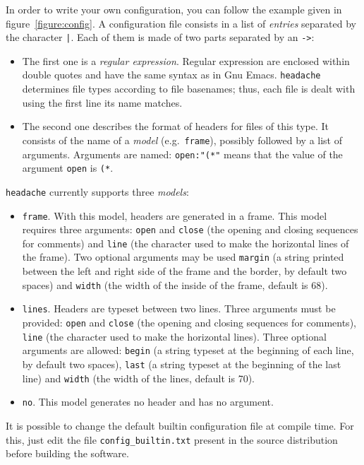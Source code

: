 \documentclass{article}
\newcommand{\mytt}[1]{\texttt{#1}}
\newcommand{\headache}{\mytt{headache}}
\begin{document}
In order to write your own configuration, you can follow the example
given in figure~\ref{figure:config}.  A configuration file consists in
a list of \emph{entries} separated by the character \mytt{|}.  Each
of them is made of two parts separated by an \mytt{->}:
\begin{itemize}
\item The first one is a \emph{regular expression}.  Regular
  expression are enclosed within double quotes and have the same
  syntax as in Gnu Emacs.  \headache{} determines file types according to
  file basenames; thus, each file is dealt with using the first line
  its name matches.
\item The second one describes the format of headers for files of this
  type.  It consists of the name of a \emph{model} (e.g.\ 
  \mytt{frame}), possibly followed by a list of arguments.  Arguments
  are named: \mytt{open:"(*"} means that the value of the argument
  \mytt{open} is \mytt{(*}.
\end{itemize}
\headache{} currently supports three \emph{models}:
\begin{itemize}
\item \mytt{frame}.  With this model, headers are generated in a
  frame.  This model requires three arguments: \mytt{open} and
  \mytt{close} (the opening and closing sequences for comments) and
  \mytt{line} (the character used to make the horizontal lines of the
  frame).  Two optional arguments may be used \mytt{margin} (a string
  printed between the left and right side of the frame and the border,
  by default two spaces) and \mytt{width} (the width of the inside of
  the frame, default is 68).
\item \mytt{lines}.  Headers are typeset between two lines.  Three
  arguments must be provided: \mytt{open} and \mytt{close} (the
  opening and closing sequences for comments), \mytt{line} (the
  character used to make the horizontal lines).  Three optional
  arguments are allowed: \mytt{begin} (a string typeset at the
  beginning of each line, by default two spaces), \mytt{last} (a
  string typeset at the beginning of the last line) and \mytt{width}
  (the width of the lines, default is 70).
\item \mytt{no}.  This model generates no header and has no argument.
\end{itemize}

It is possible to change the default builtin configuration file at
compile time.  For this, just edit the file \mytt{config\_builtin.txt}
present in the source distribution before building the software.
\end{document}

